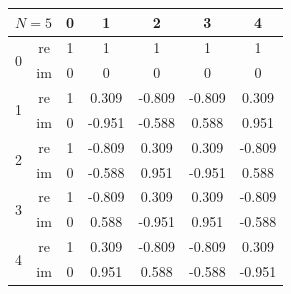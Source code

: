 \begin{center}
	\begin{tabular}{| c c c c c c c |}
		\hline
		\multicolumn{2}{|c}{$N=5$} & \multicolumn{1}{c}{ \tiny 0} & \multicolumn{1}{c}{ \tiny 1} & \multicolumn{1}{c}{ \tiny 2} & \multicolumn{1}{c}{ \tiny 3} & \multicolumn{1}{c|}{ \tiny 4}          \\
		\hline
		\hline
		\multirow{2}{*}{0}         & re                           & 1                            & 1                            & 1                            & 1                             & 1      \\
		                           & im                           & 0                            & 0                            & 0                            & 0                             & 0      \\
		\hline\hline
		\multirow{2}{*}{1}         & re                           & 1                            & 0.309                        & -0.809                       & -0.809                        & 0.309  \\
		                           & im                           & 0                            & -0.951                       & -0.588                       & 0.588                         & 0.951  \\
		\hline\hline
		\multirow{2}{*}{2}         & re                           & 1                            & -0.809                       & 0.309                        & 0.309                         & -0.809 \\
		                           & im                           & 0                            & -0.588                       & 0.951                        & -0.951                        & 0.588  \\
		\hline\hline
		\multirow{2}{*}{3}         & re                           & 1                            & -0.809                       & 0.309                        & 0.309                         & -0.809 \\
		                           & im                           & 0                            & 0.588                        & -0.951                       & 0.951                         & -0.588 \\
		\hline\hline
		\multirow{2}{*}{4}         & re                           & 1                            & 0.309                        & -0.809                       & -0.809                        & 0.309  \\
		                           & im                           & 0                            & 0.951                        & 0.588                        & -0.588                        & -0.951 \\
		\hline
	\end{tabular}
\end{center}

